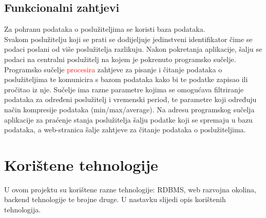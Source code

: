 \documentclass[zavrsnirad]{fer}
\begin{document}
\section{Funkcionalni zahtjevi}
Za pohranu podataka o poslužiteljima se koristi baza podataka.
\\Svakom poslužitelju koji se prati se dodijeljuje jedinstveni identifikator čime se podaci poslani od više poslužitelja razlikuju. Nakon pokretanja aplikacije, šalju se podaci na centralni poslužitelj na kojem je pokrenuto programsko sučelje.
\\Programsko sučelje \textcolor{red}{procesira } zahtjeve za pisanje i čitanje podataka o poslužiteljima te komunicira s bazom podataka kako bi te podatke zapisao ili pročitao iz nje. Sučelje ima razne parametre kojima se omogućava filtriranje podataka za određeni poslužitelj i vremenski period, te parametre koji određuju način kompresije podataka (min/max/average). Na adresu programskog sučelja aplikacije za praćenje stanja poslužitelja šalju podatke koji se spremaju u bazu podataka, a web-stranica šalje zahtjeve za čitanje podataka o poslužiteljima.

\chapter{Korištene tehnologije}
\label{pog:koristene_tehnologije}
U ovom projektu su korištene razne tehnologije: RDBMS, web razvojna okolina, backend tehnologije te brojne druge. U nastavku slijedi opis korištenih tehnologija.
\end{document}
